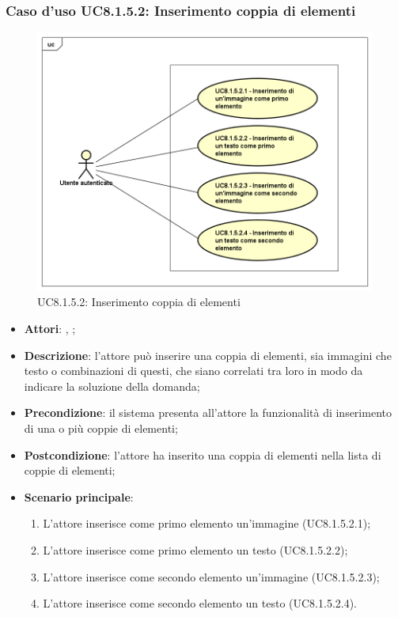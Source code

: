 	\subsubsection{Caso d'uso UC8.1.5.2: Inserimento coppia di elementi}
	\begin{figure}[h]
		\centering
		\includegraphics[scale=0.5,keepaspectratio]{UML/UC8_1_5_2.png}
		\caption{UC8.1.5.2: Inserimento coppia di elementi}
	\end{figure}
	\FloatBarrier
	\begin{itemize}
		\item \textbf{Attori}: \uau, \uaupro;
		\item \textbf{Descrizione}: l'attore può inserire una coppia di elementi, sia immagini che testo o combinazioni di questi, che siano correlati tra loro in modo da indicare la soluzione della domanda; 
		\item \textbf{Precondizione}: il sistema presenta all'attore la funzionalità di inserimento di una o più coppie di elementi;
		\item \textbf{Postcondizione}: l'attore ha inserito una coppia di elementi nella lista di coppie di elementi; 
		\item \textbf{Scenario principale}: 
		\begin{enumerate}
			\item L'attore inserisce come primo elemento un'immagine (UC8.1.5.2.1);
			\item L'attore inserisce come primo elemento un testo (UC8.1.5.2.2);
			\item L'attore inserisce come secondo elemento un'immagine (UC8.1.5.2.3);
			\item L'attore inserisce come secondo elemento un testo (UC8.1.5.2.4).	
		\end{enumerate}
	\end{itemize}
	
